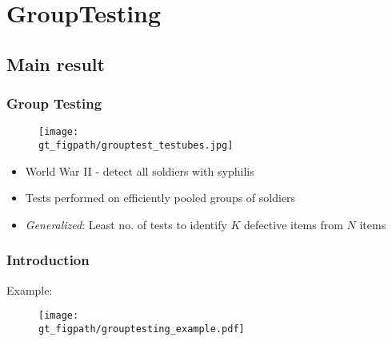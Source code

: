 \section{GroupTesting}
\subsection{Main result}
\begin{frame}\frametitle{Group Testing}
	\begin{figure}[t]
		\centering
		\texttt{[image: \\gt\_figpath/grouptest\_testubes.jpg]}
	\end{figure}

\begin{itemize}
	\item World War II - detect all soldiers with syphilis
	\item Tests performed on efficiently pooled groups of soldiers
	\pause
	\item \emph{Generalized}: Least no. of tests to identify $K$ defective items from $N$ items
\end{itemize}	

\end{frame}

\begin{frame}\frametitle{Introduction}
Example:
\vspace{-0.3in}
	\begin{figure}[t]
		\centering
		\texttt{[image: \\gt\_figpath/grouptesting\_example.pdf]}
	\end{figure}
\end{frame}

